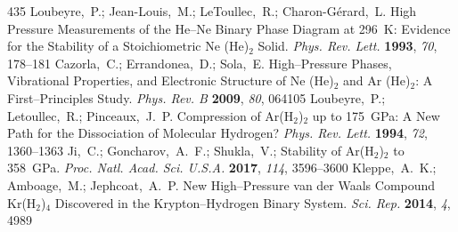 \documentclass[12pt,letterpaper,oneside]{article}
\begin{document}
\begin{mcitethebibliography}{435}
\mciteBstWouldAddEndPuncttrue
\mciteSetBstMidEndSepPunct{\mcitedefaultmidpunct}
{\mcitedefaultendpunct}{\mcitedefaultseppunct}\relax
\EndOfBibitem
{}
Loubeyre,~P.; Jean-Louis,~M.; LeToullec,~R.; Charon-G{\'e}rard,~L. High
  Pressure Measurements of the He--Ne Binary Phase Diagram at 296~K: Evidence
  for the Stability of a Stoichiometric Ne (He)$_2$ Solid. \emph{Phys. Rev.
  Lett.} \textbf{1993}, \emph{70}, 178--181\relax
\mciteBstWouldAddEndPuncttrue
\mciteSetBstMidEndSepPunct{\mcitedefaultmidpunct}
{\mcitedefaultendpunct}{\mcitedefaultseppunct}\relax
\EndOfBibitem
{}
Cazorla,~C.; Errandonea,~D.; Sola,~E. High--Pressure Phases, Vibrational
  Properties, and Electronic Structure of Ne (He)$_2$ and Ar (He)$_2$: A
  First--Principles Study. \emph{Phys. Rev. B} \textbf{2009}, \emph{80},
  064105\relax
\mciteBstWouldAddEndPuncttrue
\mciteSetBstMidEndSepPunct{\mcitedefaultmidpunct}
{\mcitedefaultendpunct}{\mcitedefaultseppunct}\relax
\EndOfBibitem
{}
Loubeyre,~P.; Letoullec,~R.; Pinceaux,~J.~P. Compression of Ar(H$_2$)$_2$ up to
  175~GPa: A New Path for the Dissociation of Molecular Hydrogen? \emph{Phys.
  Rev. Lett.} \textbf{1994}, \emph{72}, 1360--1363\relax
\mciteBstWouldAddEndPuncttrue
\mciteSetBstMidEndSepPunct{\mcitedefaultmidpunct}
{\mcitedefaultendpunct}{\mcitedefaultseppunct}\relax
\EndOfBibitem
{}
Ji,~C.; Goncharov,~A.~F.; Shukla,~V.; 
  Stability of Ar(H$_2$)$_2$ to 358~GPa. \emph{Proc. Natl. Acad. Sci. U.S.A.}
  \textbf{2017}, \emph{114}, 3596--3600\relax
\mciteBstWouldAddEndPuncttrue
\mciteSetBstMidEndSepPunct{\mcitedefaultmidpunct}
{\mcitedefaultendpunct}{\mcitedefaultseppunct}\relax
\EndOfBibitem
{}
Kleppe,~A.~K.; Amboage,~M.; Jephcoat,~A.~P. New High--Pressure van der Waals
  Compound Kr(H$_{2}$)$_{4}$ Discovered in the Krypton--Hydrogen Binary System.
  \emph{Sci. Rep.} \textbf{2014}, \emph{4}, 4989\relax
\mciteBstWouldAddEndPuncttrue
\mciteSetBstMidEndSepPunct{\mcitedefaultmidpunct}
{\mcitedefaultendpunct}{\mcitedefaultseppunct}\relax
\EndOfBibitem
{}

\end{mcitethebibliography}
\end{document}
